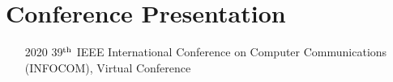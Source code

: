 \section*{Conference Presentation}

\begin{itemize}
    \item[2020] 39$^{\textnormal{th}}$ IEEE International Conference on Computer Communications (INFOCOM), Virtual Conference
\end{itemize}